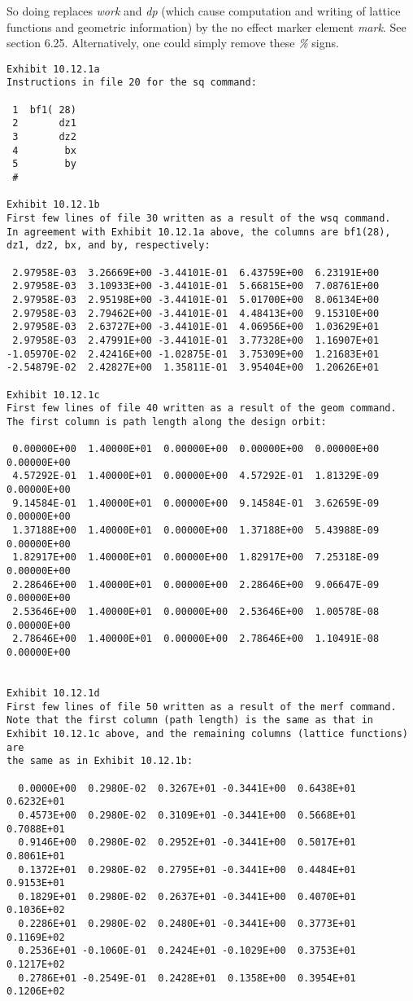 So doing replaces {\em work} and {\em dp} (which cause
computation and writing of lattice functions and geometric information) by the no effect marker
element {\em mark}.  See section 6.25.  Alternatively, one could simply
remove these {\em \%} signs.

\begin{footnotesize}
\begin{verbatim}
Exhibit 10.12.1a
Instructions in file 20 for the sq command:

 1  bf1( 28)
 2       dz1
 3       dz2
 4        bx
 5        by
 #

Exhibit 10.12.1b
First few lines of file 30 written as a result of the wsq command.
In agreement with Exhibit 10.12.1a above, the columns are bf1(28),
dz1, dz2, bx, and by, respectively:

 2.97958E-03  3.26669E+00 -3.44101E-01  6.43759E+00  6.23191E+00
 2.97958E-03  3.10933E+00 -3.44101E-01  5.66815E+00  7.08761E+00
 2.97958E-03  2.95198E+00 -3.44101E-01  5.01700E+00  8.06134E+00
 2.97958E-03  2.79462E+00 -3.44101E-01  4.48413E+00  9.15310E+00
 2.97958E-03  2.63727E+00 -3.44101E-01  4.06956E+00  1.03629E+01
 2.97958E-03  2.47991E+00 -3.44101E-01  3.77328E+00  1.16907E+01
-1.05970E-02  2.42416E+00 -1.02875E-01  3.75309E+00  1.21683E+01
-2.54879E-02  2.42827E+00  1.35811E-01  3.95404E+00  1.20626E+01

Exhibit 10.12.1c
First few lines of file 40 written as a result of the geom command.
The first column is path length along the design orbit:

 0.00000E+00  1.40000E+01  0.00000E+00  0.00000E+00  0.00000E+00  0.00000E+00
 4.57292E-01  1.40000E+01  0.00000E+00  4.57292E-01  1.81329E-09  0.00000E+00
 9.14584E-01  1.40000E+01  0.00000E+00  9.14584E-01  3.62659E-09  0.00000E+00
 1.37188E+00  1.40000E+01  0.00000E+00  1.37188E+00  5.43988E-09  0.00000E+00
 1.82917E+00  1.40000E+01  0.00000E+00  1.82917E+00  7.25318E-09  0.00000E+00
 2.28646E+00  1.40000E+01  0.00000E+00  2.28646E+00  9.06647E-09  0.00000E+00
 2.53646E+00  1.40000E+01  0.00000E+00  2.53646E+00  1.00578E-08  0.00000E+00
 2.78646E+00  1.40000E+01  0.00000E+00  2.78646E+00  1.10491E-08  0.00000E+00


Exhibit 10.12.1d
First few lines of file 50 written as a result of the merf command.
Note that the first column (path length) is the same as that in
Exhibit 10.12.1c above, and the remaining columns (lattice functions) are
the same as in Exhibit 10.12.1b:

  0.0000E+00  0.2980E-02  0.3267E+01 -0.3441E+00  0.6438E+01  0.6232E+01
  0.4573E+00  0.2980E-02  0.3109E+01 -0.3441E+00  0.5668E+01  0.7088E+01
  0.9146E+00  0.2980E-02  0.2952E+01 -0.3441E+00  0.5017E+01  0.8061E+01
  0.1372E+01  0.2980E-02  0.2795E+01 -0.3441E+00  0.4484E+01  0.9153E+01
  0.1829E+01  0.2980E-02  0.2637E+01 -0.3441E+00  0.4070E+01  0.1036E+02
  0.2286E+01  0.2980E-02  0.2480E+01 -0.3441E+00  0.3773E+01  0.1169E+02
  0.2536E+01 -0.1060E-01  0.2424E+01 -0.1029E+00  0.3753E+01  0.1217E+02
  0.2786E+01 -0.2549E-01  0.2428E+01  0.1358E+00  0.3954E+01  0.1206E+02


\end{verbatim}
\end{footnotesize}
